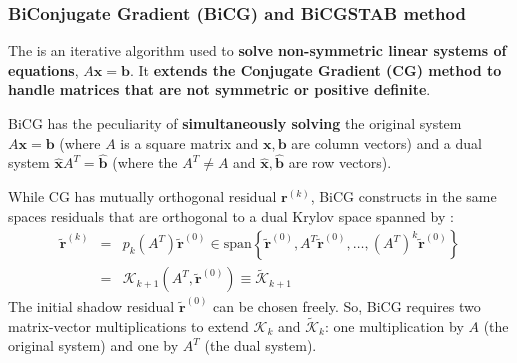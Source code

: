 \subsubsection{BiConjugate Gradient (BiCG) and BiCGSTAB method}

The  is an iterative algorithm used to \textbf{solve non-symmetric linear systems of equations}, $A\mathbf{x} = \mathbf{b}$. It \textbf{extends the Conjugate Gradient (CG) method to handle matrices that are not symmetric or positive definite}.

\highspace
BiCG has the peculiarity of \textbf{simultaneously solving} the original system $A\mathbf{x} = \mathbf{b}$ (where $A$ is a square matrix and $\mathbf{x}, \mathbf{b}$ are column vectors) and a dual system $\widehat{\mathbf{x}} A^{T} = \widehat{\mathbf{b}}$ (where the $A^{T} \ne A$ and $\widehat{\mathbf{x}}, \widehat{\mathbf{b}}$ are row vectors).

\highspace
While CG has mutually orthogonal residual $\mathbf{r}^{\left(k\right)}$, BiCG constructs in the same spaces residuals that are orthogonal to a dual Krylov space spanned by :
\begin{equation}
    \begin{array}{rcl}
        \tilde{\mathbf{r}}^{\left(k\right)} &=& p_{k}\left(A^{T}\right) \tilde{\mathbf{r}}^{\left(0\right)} \in \mathrm{span} \left\{ \tilde{\mathbf{r}}^{\left(0\right)}, A^{T}\tilde{\mathbf{r}}^{\left(0\right)}, \dots, \left(A^{T}\right)^{k} \tilde{\mathbf{r}}^{\left(0\right)} \right\} \\ [1em]
        &=& \mathcal{K}_{k+1} \left(A^{T}, \tilde{\mathbf{r}}^{\left(0\right)}\right) \equiv \tilde{\mathcal{K}}_{k+1}
    \end{array}
\end{equation}
The initial shadow residual $\tilde{\mathbf{r}}^{\left(0\right)}$ can be chosen freely. So, BiCG requires two matrix-vector multiplications to extend $\mathcal{K}_{k}$ and $\tilde{\mathcal{K}}_{k}$: one multiplication by $A$ (the original system) and one by $A^{T}$ (the dual system).

